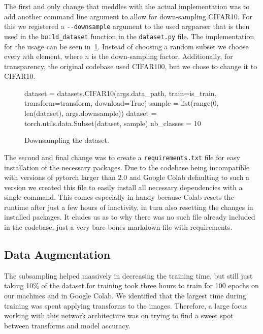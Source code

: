\documentclass{article}
\begin{document}
The first and only change that meddles with the actual implementation was to add another command line argument to allow for down-sampling CIFAR10.
For this we registered a \verb|--downsample| argument to the used argparser that is then used in the \verb|build_dataset| function in the \texttt{dataset.py} file.
The implementation for the usage can be seen in~\ref{fig:downsampling}.
Instead of choosing a random subset we choose every $n$th element, where $n$ is the down-sampling factor.
Additionally, for transparency, the original codebase used CIFAR100, but we chose to change it to CIFAR10.
\begin{figure}[h]
    \begin{python}
dataset = datasets.CIFAR10(args.data_path, train=is_train,
                            transform=transform, download=True)
sample = list(range(0, len(dataset), args.downsample))
dataset = torch.utils.data.Subset(dataset, sample)
nb_classes = 10
    \end{python}
    \caption{Downsampling the dataset.}
    \label{fig:downsampling}
\end{figure}

The second and final change was to create a \texttt{requirements.txt} file for easy installation of the necessary packages.
Due to the codebase being incompatible with versions of pytorch larger than 2.0 and Google Colab defaulting to such a version we created this file to easily install all necessary dependencies with a single command.
This comes especially in handy because Colab resets the runtime after just a few hours of inactivity, in turn also resetting the changes in installed packages.
It eludes us as to why there was no such file already included in the codebase, just a very bare-bones markdown file with requirements.

\subsection{Data Augmentation}\label{subsec:data-augmentation}
The subsampling helped massively in decreasing the training time, but still just taking 10\% of the dataset for training took three hours to train for 100 epochs on our machines and in Google Colab.
We identified that the largest time during training was spent applying transforms to the images.
Therefore, a large focus working with this network architecture was on trying to find a sweet spot between transforms and model accuracy.
\end{document}
